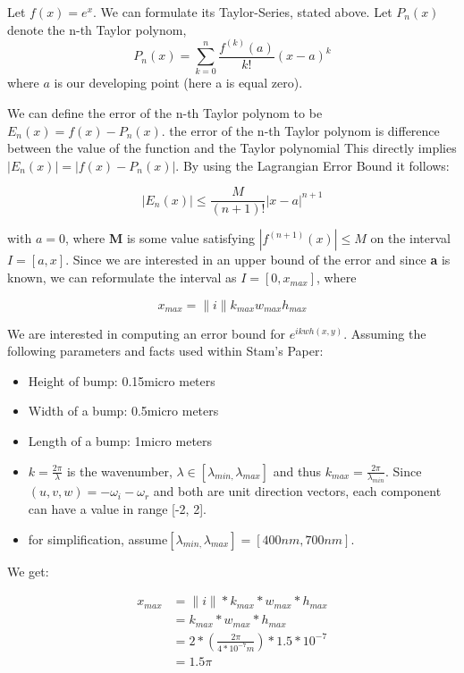 Let $f(x)=e^{x}$. We can formulate its Taylor-Series, stated above.
Let $P_{n}(x)$denote the n-th Taylor polynom, 
\begin{equation*}
 P_{n}(x)=\sum_{k=0}^{n}\frac{f^{(k)}(a)}{k!}(x-a)^{k}
\end{equation*}
where $a$ is our developing point (here a is equal zero). 

We can define the error of the n-th Taylor polynom to be $E_{n}(x)=f(x)-P_{n}(x)$.
the error of the n-th Taylor polynom is difference between the value of the function and the Taylor polynomial
This directly implies $|E_{n}(x)|=|f(x)-P_{n}(x)|$. By using the Lagrangian Error Bound it follows: 

\begin{equation*}
 |E_{n}(x)|\leq\frac{M}{(n+1)!}|x-a|^{n+1} 
\end{equation*}

with $a=0$, where \textbf{M} is some value satisfying $|f^{(n+1)}(x)|\leq M$ on the interval $I=[a,x]$. Since we are interested in an upper bound of the error and since \textbf{a} is known, we can reformulate the interval as $I=[0,x_{max}]$, where 

\begin{equation*}
 x_{max} = \|i\| k_{max} w_{max} h_{max}
\end{equation*}

We are interested in computing an error bound for $e^{ikwh(x,y)}$. Assuming the following parameters and facts used within Stam's Paper: 

\begin{itemize}
\item Height of bump: 0.15micro meters
\item Width of a bump: 0.5micro meters
\item Length of a bump: 1micro meters
\item $k=\frac{2\pi}{\lambda}$ is the wavenumber, $\lambda\in[\lambda_{min,}\lambda_{max}]$ and
thus $k_{max}=\frac{2\pi}{\lambda_{min}}$. Since $(u,v,w) = -\omega_i - \omega_r$ and both are unit direction vectors, 
each component can have a value in range {[}-2, 2{]}.
\item for simplification, assume$[\lambda_{min,}\lambda_{max}]=[400nm,700nm].$

\end{itemize}

We get:  

\begin{align*}
x_{max}
 &= \|i\|*k_{max}*w_{max}*h_{max} \\
 &= k_{max}*w_{max}*h_{max} \\
 &=2*(\frac{2\pi}{4*10^{-7}m})*1.5*10^{-7} \\
 &=1.5\pi
\end{align*}

